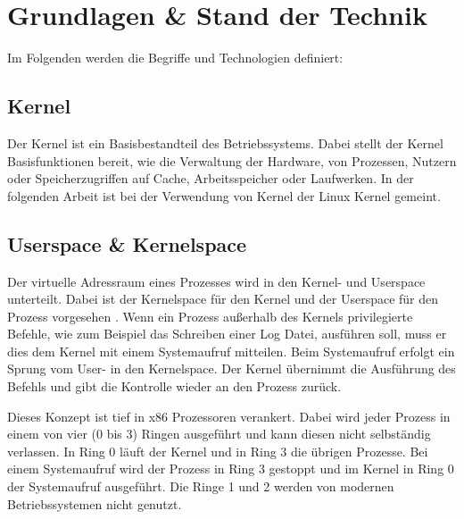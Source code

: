 \chapter{Grundlagen \& Stand der Technik}

Im Folgenden werden die Begriffe und Technologien definiert:

\section{Kernel}
Der Kernel ist ein Basisbestandteil des Betriebssystems. Dabei stellt der Kernel Basisfunktionen bereit, wie die Verwaltung der Hardware, von Prozessen, Nutzern oder Speicherzugriffen auf Cache, Arbeitsspeicher oder Laufwerken. In der folgenden Arbeit ist bei der Verwendung von Kernel der Linux Kernel gemeint. \cite[vgl.][S. 16 f.]{Baun.2017}

\section{Userspace \& Kernelspace}
\label{sec:user_kernelspace}
Der virtuelle Adressraum eines Prozesses wird in den Kernel- und Userspace unterteilt. Dabei ist der Kernelspace für den Kernel und der Userspace für den Prozess vorgesehen \cite[vgl.][101]{Baun.2017}. 
Wenn ein Prozess außerhalb des Kernels privilegierte Befehle, wie zum Beispiel das Schreiben einer Log Datei, ausführen soll, muss er dies dem Kernel mit einem Systemaufruf mitteilen.
Beim Systemaufruf erfolgt ein Sprung vom User- in den Kernelspace. Der Kernel übernimmt die Ausführung des Befehls und gibt die Kontrolle wieder an den Prozess zurück. \cite[vgl.][S. 135 f.]{Baun.2017}

Dieses Konzept ist tief in x86 Prozessoren verankert. Dabei wird jeder Prozess in einem von vier (0 bis 3) Ringen ausgeführt und kann diesen nicht selbständig verlassen. In Ring 0 läuft der Kernel und in Ring 3 die übrigen Prozesse. Bei einem Systemaufruf wird der Prozess in Ring 3 gestoppt und im Kernel in Ring 0 der Systemaufruf ausgeführt. Die Ringe 1 und 2 werden von modernen Betriebssystemen nicht genutzt.  \cite[vgl.][136, 235]{Baun.2017}


